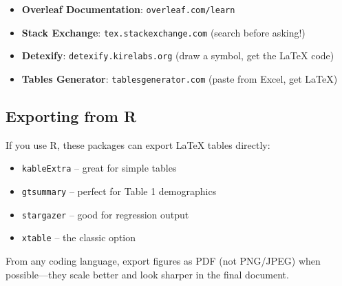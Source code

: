 \documentclass[../main.tex]{subfiles}
\begin{document}
\begin{itemize}
    \item \textbf{Overleaf Documentation}: \texttt{overleaf.com/learn}
    \item \textbf{Stack Exchange}: \texttt{tex.stackexchange.com} (search before asking!)
    \item \textbf{Detexify}: \texttt{detexify.kirelabs.org} (draw a symbol, get the \LaTeX{} code)
    \item \textbf{Tables Generator}: \texttt{tablesgenerator.com} (paste from Excel, get \LaTeX{})
\end{itemize}

\subsection*{Exporting from R}

If you use R, these packages can export \LaTeX{} tables directly:

\begin{itemize}
    \item \texttt{kableExtra} -- great for simple tables
    \item \texttt{gtsummary} -- perfect for Table 1 demographics
    \item \texttt{stargazer} -- good for regression output
    \item \texttt{xtable} -- the classic option
\end{itemize}

From any coding language, export figures as PDF (not PNG/JPEG) when possible---they scale better and look sharper in the final document.

\clearpage
\end{document}

